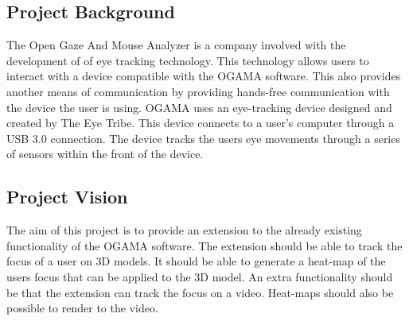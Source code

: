 \subsection{Project Background}
The Open Gaze And Mouse Analyzer is a company involved with the development of of eye tracking technology. This technology allows users to interact with a device compatible with the OGAMA software. This also provides another means of communication by providing hands-free communication with the device the user is using.
    OGAMA uses an eye-tracking device designed and created by The Eye Tribe. This device connects to a user's computer through a USB 3.0 connection. The device tracks the users eye movements through a series of sensors within the front of the device.

\subsection{Project Vision}
The aim of this project is to provide an extension to the already existing functionality of the OGAMA software. The extension should be able to track the focus of a user on 3D models. It should be able to generate a heat-map of the users focus that can be applied to the 3D model. An extra functionality should be that the extension can track the focus on a video. Heat-maps should also be possible to render to the video.
